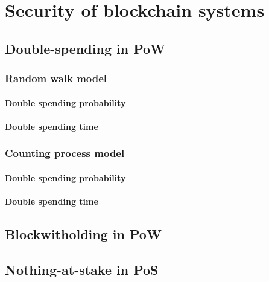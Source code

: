 \chapter{Security of blockchain systems}\label{chap:security}

\section{Double-spending in PoW}\label{sec:double_spending}
\subsection{Random walk model}\label{ssec:double_spending_rw}
\subsubsection{Double spending probability}\label{sssec:double_spending_rw_dsp}

\subsubsection{Double spending time}\label{sssec:double_spending_rw_dst}
\subsection{Counting process model}\label{sec:counting_process}
\subsubsection{Double spending probability}\label{sssec:double_spending_counting_process_dsp}

\subsubsection{Double spending time}\label{sssec:double_spending_counting_process_dst}

\section{Blockwitholding in PoW}\label{sec:blockwithholding}

\section{Nothing-at-stake in PoS}\label{sec:NaS}
\newpage